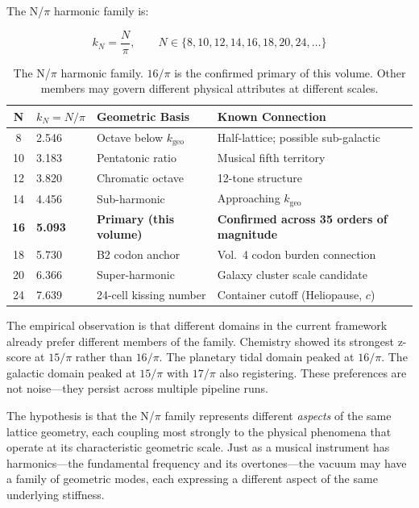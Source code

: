 \documentclass[11pt, letterpaper, openany]{book}
\begin{document}
The N/$\pi$ harmonic family is:

\[
k_N = \frac{N}{\pi}, \qquad N \in \{8, 10, 12, 14, 16, 18, 20, 24, \ldots\}
\]

\begin{table}[H]
\centering
\renewcommand{\arraystretch}{1.4}
\begin{tabular}{|c|l|l|l|}
\hline
\textbf{N} & \textbf{$k_N = N/\pi$} & \textbf{Geometric Basis} & \textbf{Known Connection} \\
\hline\hline
8  & 2.546 & Octave below $k_\text{geo}$ & Half-lattice; possible sub-galactic \\
10 & 3.183 & Pentatonic ratio & Musical fifth territory \\
12 & 3.820 & Chromatic octave & 12-tone structure \\
14 & 4.456 & Sub-harmonic & Approaching $k_\text{geo}$ \\
\textbf{16} & \textbf{5.093} & \textbf{Primary (this volume)} & \textbf{Confirmed across 35 orders of magnitude} \\
18 & 5.730 & B2 codon anchor & Vol.~4 codon burden connection \\
20 & 6.366 & Super-harmonic & Galaxy cluster scale candidate \\
24 & 7.639 & 24-cell kissing number & Container cutoff (Heliopause, $c$) \\
\hline
\end{tabular}
\caption{The N/$\pi$ harmonic family. $16/\pi$ is the confirmed primary of this volume.
Other members may govern different physical attributes at different scales.}
\label{tab:npi_family}
\end{table}

The empirical observation is that different domains in the current framework already
prefer different members of the family. Chemistry showed its strongest z-score at
$15/\pi$ rather than $16/\pi$. The planetary tidal domain peaked at $16/\pi$. The
galactic domain peaked at $15/\pi$ with $17/\pi$ also registering. These preferences
are not noise---they persist across multiple pipeline runs.

The hypothesis is that the N/$\pi$ family represents different \emph{aspects} of the
same lattice geometry, each coupling most strongly to the physical phenomena that
operate at its characteristic geometric scale. Just as a musical instrument has
harmonics---the fundamental frequency and its overtones---the vacuum may have a family
of geometric modes, each expressing a different aspect of the same underlying stiffness.
\end{document}

